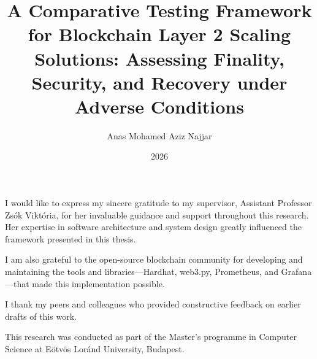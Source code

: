 \documentclass[
]{elteikthesis}[2024/04/26]
\title{A Comparative Testing Framework for Blockchain Layer 2 Scaling Solutions: Assessing Finality, Security, and Recovery under Adverse Conditions} %
\date{2026} %
\author{Anas Mohamed Aziz Najjar}
\affiliation{Assistant Professor} %
\begin{document}


\maketitle


\tableofcontents
\cleardoublepage


\cleardoublepage


\cleardoublepage


\cleardoublepage


\cleardoublepage


\cleardoublepage


\cleardoublepage


\cleardoublepage

\chapter*{\acklabel}
I would like to express my sincere gratitude to my supervisor, Assistant Professor Zsók Viktória, for her invaluable guidance and support throughout this research. Her expertise in software architecture and system design greatly influenced the framework presented in this thesis.

I am also grateful to the open-source blockchain community for developing and maintaining the tools and libraries---Hardhat, web3.py, Prometheus, and Grafana---that made this implementation possible.

I thank my peers and colleagues who provided constructive feedback on earlier drafts of this work.

This research was conducted as part of the Master's programme in Computer Science at Eötvös Loránd University, Budapest.

\cleardoublepage
\end{document}
